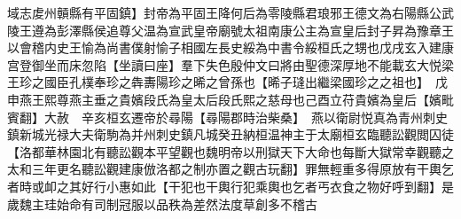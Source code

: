 域志䖍州贑縣有平固鎮】封帝為平固王降何后為零陵縣君琅邪王德文為右陽縣公武陵王遵為彭澤縣侯追尊父温為宣武皇帝廟號太祖南康公主為宣皇后封子昇為豫章王以會稽内史王愉為尚書僕射愉子相國左長史綏為中書令綏桓氏之甥也戊戌玄入建康宫登御坐而床忽陷【坐讀曰座】羣下失色殷仲文曰將由聖德深厚地不能載玄大悦梁王珍之國臣孔樸奉珍之犇夀陽珍之晞之曾孫也【晞子㻱出繼梁國珍之之祖也】　戊申燕王熙尊燕主垂之貴嬪段氏為皇太后段氏熙之慈母也己酉立苻貴嬪為皇后【嬪毗賓翻】大赦　辛亥桓玄遷帝於尋陽【尋陽郡時治柴桑】　燕以衛尉悦真為青州刺史鎮新城光禄大夫衛駒為并州刺史鎮凡城癸丑納桓温神主于太廟桓玄臨聽訟觀閲囚徒【洛都華林園北有聽訟觀本平望觀也魏明帝以刑獄天下大命也每斷大獄常幸觀聽之太和三年更名聽訟觀建康倣洛都之制亦置之觀古玩翻】罪無輕重多得原放有干輿乞者時或卹之其好行小惠如此【干犯也干輿行犯乘輿也乞者丐衣食之物好呼到翻】是歲魏主珪始命有司制冠服以品秩為差然法度草創多不稽古

